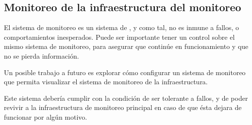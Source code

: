 \subsection{Monitoreo de la infraestructura del monitoreo}
\label{del-monitoreo}

El sistema de monitoreo es un sistema de , y como tal, no es
inmune a fallos,  o comportamientos inesperados. Puede ser importante
tener un control sobre el mismo sistema de monitoreo, para asegurar que
continúe en funcionamiento y que no se pierda información.

Un posible trabajo a futuro es explorar cómo configurar un sistema de monitoreo
que permita visualizar el sistema de monitoreo de la infraestructura.

Este sistema debería cumplir con la condición de ser tolerante a fallos, y de
poder revivir a la infraestructura de monitoreo principal en caso de que ésta
dejara de funcionar por algún motivo.
